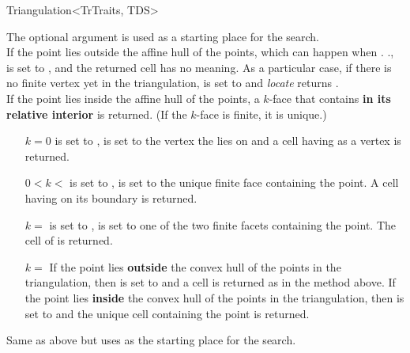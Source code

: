 \begin{ccRefClass}{Triangulation<TrTraits, TDS>}
{The optional argument  is used as a starting place for the
search.\\ If the  point lies outside the affine hull of the points,
which can happen when \ccVar.
\ccVar.,  is set to
, and the returned cell has no meaning. As a
particular case, if there is no finite vertex yet in the triangulation,
 is set to  and \textit{locate} returns
.\\ If the  point lies inside the affine hull
of the points, a $k$-face that contains  \textbf{in its relative
interior} is returned. (If the $k$-face is finite, it is
unique.)\begin{itemize} \item[$k=0$]  is set to ,
 is set to the vertex  the  lies on and a cell
having  as a vertex is returned.
\item[$0<k<$\ccc{c.current_dimension()-1}]  is set to
,  is set to the unique finite face containing the
 point. A cell having  on its boundary is returned.
\item[$k=$\ccc{c.current_dimension()-1}]  is set to
,  is set to one of the two finite facets containing the
 point. The cell of  is returned.
\item[$k=$\ccc{c.current_dimension()}] If the  point lies
\textbf{outside} the convex hull of the points in the triangulation, then
 is set to  and a cell is returned
as in the  method above. If the  point lies
\textbf{inside} the convex hull of the points in the triangulation, then
 is set to  and the unique cell containing
the  point is returned. \end{itemize}}

{Same as above but uses  as the starting place for the search.}



\end{ccRefClass}
